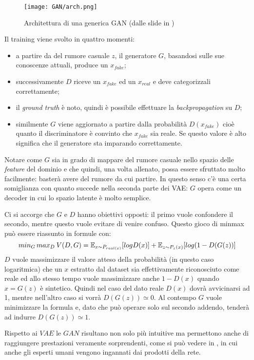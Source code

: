 \begin{figure}[ht]
  \centering
  \texttt{[image: GAN/arch.png]}
  \caption{Architettura di una generica GAN (dalle slide in \cite{MIT_GEN})}
  \label{fig:gan}
\end{figure}
\noindent
Il training viene svolto in quattro momenti:
\begin{itemize}
  \item a partire da del rumore casuale $z$, il generatore $G$, basandosi sulle sue conoscenze attuali, produce un $x_{fake}$;
  \item successivamente $D$ riceve un $x_{fake}$ ed un $x_{real}$ e deve categorizzali correttamente;
  \item il \emph{ground truth} è noto, quindi è possibile effettuare la \emph{backpropagation} su $D$;
  \item similmente $G$ viene aggiornato a partire dalla probabilità $D(x_{fake})$ cioè quanto il discriminatore è convinto che $x_{fake}$ sia reale.
    Se questo valore è alto significa che il generatore sta imparando correttamente.
\end{itemize}
Notare come $G$ sia in grado di mappare del rumore casuale nello spazio delle \emph{feature} del dominio e che quindi, una volta allenato, possa essere sfruttato molto facilmente: basterà avere del rumore da cui partire.
In questo senso c'è una certa somiglianza con quanto succede nella seconda parte dei VAE: $G$ opera come un decoder in cui lo spazio latente è molto semplice.

Ci si accorge che $G$ e $D$ hanno obiettivi opposti: il primo vuole confondere il secondo, mentre questo vuole evitare di venire confuso.
Questo gioco di minmax può essere riassunto in  formule con:
$$
min_G \, max_D \: V(D,G) = \mathbb{E}_{x \sim P_{real(x)}} [ log D(x) ] 
+
\mathbb{E}_{z \sim P_z(x)} [ log ( 1 - D(G(z)) ]
$$
$D$ vuole massimizzare il valore atteso della probabilità (in questo caso logaritmica) che un $x$ estratto dal dataset sia effettivamente riconosciuto come reale ed allo stesso tempo vuole massimizzare anche $ 1 - D(x)$ quando $x=G(z)$ è sintetico.
Quindi nel caso del dato reale $D(x)$ dovrà avvicinarsi ad 1, mentre nell'altro caso si vorrà $D(G(z)) \simeq 0$.
Al contempo $G$ vuole minimizzare la formula e, dato che può operare solo sul secondo addendo, tenderà ad indurre $D(G(z)) \simeq 1$.

Rispetto ai $VAE$ le $GAN$ risultano non solo più intuitive ma permettono anche di raggiungere prestazioni veramente sorprendenti, come si può vedere in \cite{GAN_HD}, in cui anche gli esperti umani vengono ingannati dai prodotti della rete.

